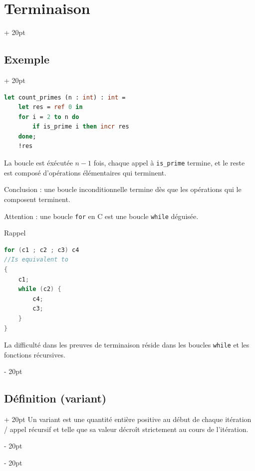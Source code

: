 \documentclass[a4paper, 12pt, twoside]{article}
\newcommand{\ind}[1][20pt]{\advance\leftskip + #1}
\newcommand{\deind}[1][20pt]{\advance\leftskip - #1}
\newenvironment{indentedenv}[1][20pt]{\par \ind[#1]}{\par \deind}
\newenvironment{indt}[2][20pt]{#2 \begin{indentedenv}[#1]}{\end{indentedenv}} %
\begin{document}
\begin{indt}{\section{Terminaison}}
\begin{indt}{\subsection{Exemple}}
            \vspace{6pt}
            
            \begin{lstlisting}[language=Caml, xleftmargin=60pt]
let count_primes (n : int) : int =
    let res = ref 0 in
    for i = 2 to n do
        if is_prime i then incr res
    done;
    !res\end{lstlisting}
            
            \vspace{6pt}
            
            La boucle est éxécutée $n - 1$ fois, chaque appel à \texttt{is\_prime} termine, et le reste est composé d'opérations élémentaires qui terminent.
            
            \vspace{6pt}
            
            Conclusion : une boucle inconditionnelle termine dès que les opérations qui le composent terminent.
            
            \vspace{6pt}
            
            Attention : une boucle \texttt{for} en C est une boucle \texttt{while} déguisée.
            
            Rappel
            
            \begin{lstlisting}[language=C, xleftmargin=60pt]
for (c1 ; c2 ; c3) c4
//Is equivalent to
{
    c1;
    while (c2) {
        c4;
        c3;
    }
}\end{lstlisting}
            
            \vspace{6pt}
            
            La difficulté dans les preuves de terminaison réside dans les boucles \texttt{while} et les fonctions récursives.
        \end{indt}
        
        \vspace{6pt}
        
        \begin{indt}{\subsection{Définition (variant)}}
            Un variant est une quantité entière positive au début de chaque itération / appel récursif et telle que sa valeur décroît strictement au cours de l'itération.
            

\end{indt}
\end{indt}
\end{document}
